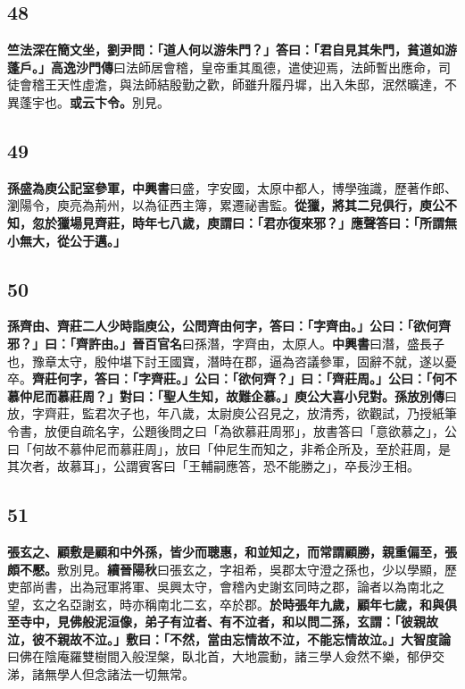 \subsection*{48}

\textbf{竺法深在簡文坐，劉尹問：「道人何以游朱門？」答曰：「君自見其朱門，貧道如游蓬戶。」}{\footnotesize \textbf{高逸沙門傳}曰法師居會稽，皇帝重其風德，遣使迎焉，法師暫出應命，司徒會稽王天性虛澹，與法師結殷勤之歡，師雖升履丹墀，出入朱邸，泯然曠達，不異蓬宇也。}\textbf{或云卞令。}{\footnotesize 別見。}

\subsection*{49}

\textbf{孫盛為庾公記室參軍，}{\footnotesize \textbf{中興書}曰盛，字安國，太原中都人，博學強識，歷著作郎、瀏陽令，庾亮為荊州，以為征西主簿，累遷祕書監。}\textbf{從獵，將其二兒俱行，庾公不知，忽於獵場見齊莊，時年七八歲，庾謂曰：「君亦復來邪？」應聲答曰：「所謂無小無大，從公于邁。」}

\subsection*{50}

\textbf{孫齊由、齊莊二人少時詣庾公，公問齊由何字，答曰：「字齊由。」公曰：「欲何齊邪？」曰：「齊許由。」}{\footnotesize \textbf{晉百官名}曰孫潛，字齊由，太原人。\textbf{中興書}曰潛，盛長子也，豫章太守，殷仲堪下討王國寶，潛時在郡，逼為咨議參軍，固辭不就，遂以憂卒。}\textbf{齊莊何字，答曰：「字齊莊。」公曰：「欲何齊？」曰：「齊莊周。」公曰：「何不慕仲尼而慕莊周？」對曰：「聖人生知，故難企慕。」庾公大喜小兒對。}{\footnotesize \textbf{孫放別傳}曰放，字齊莊，監君次子也，年八歲，太尉庾公召見之，放清秀，欲觀試，乃授紙筆令書，放便自疏名字，公題後問之曰「為欲慕莊周邪」，放書答曰「意欲慕之」，公曰「何故不慕仲尼而慕莊周」，放曰「仲尼生而知之，非希企所及，至於莊周，是其次者，故慕耳」，公謂賓客曰「王輔嗣應答，恐不能勝之」，卒長沙王相。}

\subsection*{51}

\textbf{張玄之、顧敷是顧和中外孫，皆少而聰惠，和並知之，而常謂顧勝，親重偏至，張頗不懕。}{\footnotesize 敷別見。\textbf{續晉陽秋}曰張玄之，字祖希，吳郡太守澄之孫也，少以學顯，歷吏部尚書，出為冠軍將軍、吳興太守，會稽內史謝玄同時之郡，論者以為南北之望，玄之名亞謝玄，時亦稱南北二玄，卒於郡。}\textbf{於時張年九歲，顧年七歲，和與俱至寺中，見佛般泥洹像，弟子有泣者、有不泣者，和以問二孫，玄謂：「彼親故泣，彼不親故不泣。」敷曰：「不然，當由忘情故不泣，不能忘情故泣。」}{\footnotesize \textbf{大智度論}曰佛在陰庵羅雙樹間入般涅槃，臥北首，大地震動，諸三學人僉然不樂，郁伊交涕，諸無學人但念諸法一切無常。}


